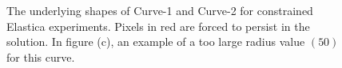 \begin{figure}
\center
{}
\caption{The underlying shapes of Curve-1 and Curve-2 for constrained Elastica experiments. Pixels in red are forced to persist in the solution. In figure (c), an example of a too large radius value $(50)$ for this curve.}
\label{fig:constrained-elastica-underlying-curve-shapes}
\end{figure}


